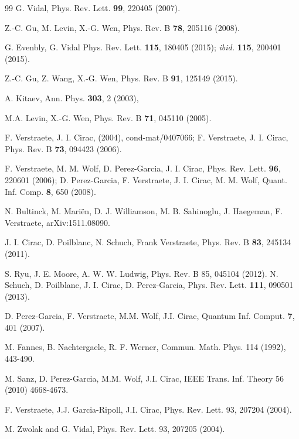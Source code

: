 \documentclass{elsarticle}
\begin{document}
\begin{thebibliography}{99}
    G. Vidal,
    Phys. Rev. Lett. {\bf 99}, 220405 (2007).

    Z.-C. Gu, M. Levin,  X.-G. Wen,
    Phys. Rev. B {\bf 78}, 205116 (2008).

    G. Evenbly,  G. Vidal
    Phys. Rev. Lett. {\bf 115}, 180405 (2015); {\it ibid.}
    {\bf 115}, 200401 (2015).

    Z.-C. Gu, Z. Wang,  X.-G. Wen,
    Phys. Rev. B {\bf 91}, 125149 (2015).

    A. Kitaev,
    Ann. Phys. {\bf 303}, 2 (2003),

    M.A. Levin, X.-G. Wen,
    Phys. Rev. B {\bf 71}, 045110 (2005).

    F. Verstraete, J. I. Cirac, (2004), cond-mat/0407066;
    F. Verstraete, J. I. Cirac, Phys. Rev. B {\bf 73}, 094423
    (2006).

    F. Verstraete, M. M. Wolf, D. Perez-Garcia,  J. I. Cirac,
    Phys. Rev. Lett. {\bf 96}, 220601 (2006);
    D. Perez-Garcia, F. Verstraete, J. I. Cirac,  M. M. Wolf,
    Quant. Inf. Comp. {\bf 8}, 650 (2008).


    N. Bultinck, M. Mari\"en, D. J. Williamson, M. B. Sahinoglu, J. Haegeman,  F. Verstraete,
    arXiv:1511.08090.

    J. I. Cirac, D. Poilblanc, N. Schuch, Frank Verstraete,
    Phys. Rev. B {\bf 83}, 245134 (2011).

    S. Ryu, J. E. Moore, A. W. W. Ludwig, Phys. Rev. B 85, 045104 (2012).
    N. Schuch, D. Poilblanc, J. I. Cirac,  D. Perez-Garcia,
    Phys. Rev. Lett. {\bf 111}, 090501 (2013).

    D. Perez-Garcia, F. Verstraete, M.M. Wolf,  J.I. Cirac,
    Quantum Inf. Comput. {\bf 7}, 401 (2007).

    M. Fannes, B. Nachtergaele, R. F. Werner,
    Commun. Math. Phys. 114 (1992), 443-490.

    M. Sanz, D. Perez-Garcia, M.M. Wolf, J.I. Cirac,
    IEEE Trans. Inf. Theory 56 (2010) 4668-4673.

    F. Verstraete, J.J. Garcia-Ripoll, J.I. Cirac,
    Phys. Rev. Lett. 93, 207204 (2004).

    M. Zwolak and G. Vidal,  Phys. Rev. Lett. 93, 207205 (2004).


\end{thebibliography}
\end{document}
